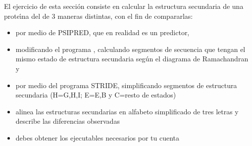 El ejercicio de esta secci\'{o}n consiste en calcular la estructura secundaria de una prote\'\i{}na del 
 de 3 maneras distintas, con el fin de compararlas:
\begin{itemize}
\item por medio de PSIPRED, que en realidad es un predictor,
\item modificando el programa , 
calculando segmentos de secuencia que tengan el mismo estado de estructura secundaria
seg\'{u}n el diagrama de Ramachandran y 
\item por medio del programa STRIDE, simplificando segmentos de estructura secundaria (H=G,H,I; E=E,B y C=resto de estados)
\item alinea las estructuras secundarias en alfabeto simplificado de tres letras y describe las diferencias observadas
\item debes obtener los ejecutables necesarios por tu cuenta %
\end{itemize}
